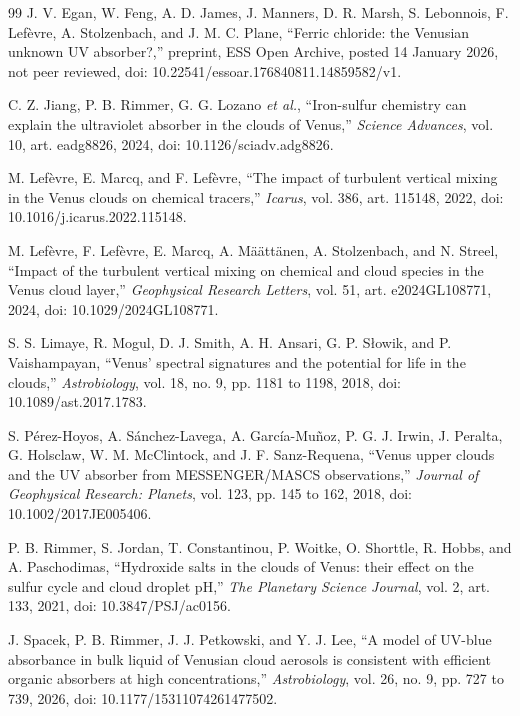 \begin{thebibliography}{99}
J. V. Egan, W. Feng, A. D. James, J. Manners, D. R. Marsh, S. Lebonnois, F. Lef\`evre,
A. Stolzenbach, and J. M. C. Plane, ``Ferric chloride: the Venusian unknown UV
absorber?,'' preprint, ESS Open Archive, posted 14 January 2026, not peer reviewed,
doi: 10.22541/essoar.176840811.14859582/v1.

C. Z. Jiang, P. B. Rimmer, G. G. Lozano \emph{et al.}, ``Iron-sulfur chemistry can
explain the ultraviolet absorber in the clouds of Venus,'' \emph{Science Advances},
vol. 10, art. eadg8826, 2024, doi: 10.1126/sciadv.adg8826.

M. Lef\`evre, E. Marcq, and F. Lef\`evre, ``The impact of turbulent vertical mixing in
the Venus clouds on chemical tracers,'' \emph{Icarus}, vol. 386, art. 115148, 2022,
doi: 10.1016/j.icarus.2022.115148.

M. Lef\`evre, F. Lef\`evre, E. Marcq, A. M\"a\"att\"anen, A. Stolzenbach, and N. Streel,
``Impact of the turbulent vertical mixing on chemical and cloud species in the Venus
cloud layer,'' \emph{Geophysical Research Letters}, vol. 51, art. e2024GL108771, 2024,
doi: 10.1029/2024GL108771.

S. S. Limaye, R. Mogul, D. J. Smith, A. H. Ansari, G. P. S\l{}owik, and
P. Vaishampayan, ``Venus' spectral signatures and the potential for life in the
clouds,'' \emph{Astrobiology}, vol. 18, no. 9, pp. 1181 to 1198, 2018,
doi: 10.1089/ast.2017.1783.

S. P\'erez-Hoyos, A. S\'anchez-Lavega, A. Garc\'ia-Mu\~noz, P. G. J. Irwin, J. Peralta,
G. Holsclaw, W. M. McClintock, and J. F. Sanz-Requena, ``Venus upper clouds and the UV
absorber from MESSENGER/MASCS observations,'' \emph{Journal of Geophysical Research:
Planets}, vol. 123, pp. 145 to 162, 2018, doi: 10.1002/2017JE005406.

P. B. Rimmer, S. Jordan, T. Constantinou, P. Woitke, O. Shorttle, R. Hobbs, and
A. Paschodimas, ``Hydroxide salts in the clouds of Venus: their effect on the sulfur
cycle and cloud droplet pH,'' \emph{The Planetary Science Journal}, vol. 2, art. 133,
2021, doi: 10.3847/PSJ/ac0156.

J. Spacek, P. B. Rimmer, J. J. Petkowski, and Y. J. Lee, ``A model of UV-blue
absorbance in bulk liquid of Venusian cloud aerosols is consistent with efficient
organic absorbers at high concentrations,'' \emph{Astrobiology}, vol. 26, no. 9,
pp. 727 to 739, 2026, doi: 10.1177/15311074261477502.


\end{thebibliography}

